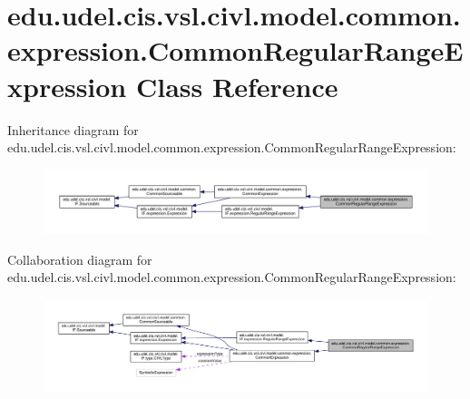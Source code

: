 \hypertarget{classedu_1_1udel_1_1cis_1_1vsl_1_1civl_1_1model_1_1common_1_1expression_1_1CommonRegularRangeExpression}{}\section{edu.\+udel.\+cis.\+vsl.\+civl.\+model.\+common.\+expression.\+Common\+Regular\+Range\+Expression Class Reference}
\label{classedu_1_1udel_1_1cis_1_1vsl_1_1civl_1_1model_1_1common_1_1expression_1_1CommonRegularRangeExpression}


Inheritance diagram for edu.\+udel.\+cis.\+vsl.\+civl.\+model.\+common.\+expression.\+Common\+Regular\+Range\+Expression\+:
\nopagebreak
\begin{figure}[H]
\begin{center}
\leavevmode
\includegraphics[width=350pt]{classedu_1_1udel_1_1cis_1_1vsl_1_1civl_1_1model_1_1common_1_1expression_1_1CommonRegularRangeExpression__inherit__graph}
\end{center}
\end{figure}


Collaboration diagram for edu.\+udel.\+cis.\+vsl.\+civl.\+model.\+common.\+expression.\+Common\+Regular\+Range\+Expression\+:
\nopagebreak
\begin{figure}[H]
\begin{center}
\leavevmode
\includegraphics[width=350pt]{classedu_1_1udel_1_1cis_1_1vsl_1_1civl_1_1model_1_1common_1_1expression_1_1CommonRegularRangeExpression__coll__graph}
\end{center}
\end{figure}
